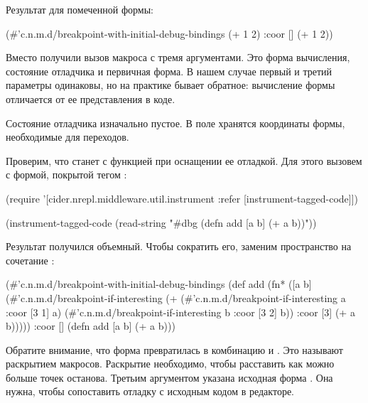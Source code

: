 Результат для помеченной формы:

\begin{english}
  \begin{clojure}
(#'c.n.m.d/breakpoint-with-initial-debug-bindings
 (+ 1 2) {:coor []} (+ 1 2))
  \end{clojure}
\end{english}

Вместо  получили вызов макроса  с тремя аргументами. Это форма вычисления, состояние отладчика и первичная форма. В нашем случае первый и третий параметры одинаковы, но на практике бывает обратное: вычисление формы отличается от ее представления в коде.

Состояние отладчика изначально пустое. В поле  хранятся координаты формы, необходимые для переходов.

Проверим, что станет с функцией  при оснащении ее отладкой. Для этого вызовем  с формой, покрытой тегом :

\begin{english}
  \begin{clojure}
(require
 '[cider.nrepl.middleware.util.instrument
    :refer [instrument-tagged-code]])

(instrument-tagged-code
 (read-string "#dbg (defn add [a b] (+ a b))"))
  \end{clojure}
\end{english}

Результат получился объемный. Чтобы сократить его, заменим пространство  на сочетание :

\begin{english}
  \begin{clojure}
(#'c.n.m.d/breakpoint-with-initial-debug-bindings
 (def
  add
  (fn*
   ([a b]
    (#'c.n.m.d/breakpoint-if-interesting
     (+
      (#'c.n.m.d/breakpoint-if-interesting
       a {:coor [3 1]} a)
      (#'c.n.m.d/breakpoint-if-interesting
       b {:coor [3 2]} b))
     {:coor [3]}
     (+ a b)))))
 {:coor []}
 (defn add [a b] (+ a b)))
  \end{clojure}
\end{english}

Обратите внимание, что форма  превратилась в комбинацию  и . Это называют раскрытием макросов. Раскрытие необходимо, чтобы расставить как можно больше точек останова. Третьим аргументом указана исходная форма . Она нужна, чтобы сопоставить отладку с исходным кодом в редакторе.

